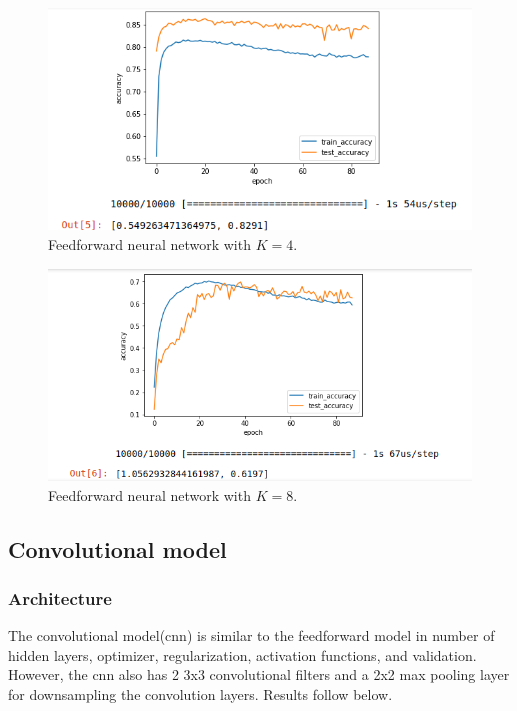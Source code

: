 \documentclass[titlepage]{article}
\begin{document}
\begin{figure}[H]
	\centering
	\includegraphics[width=1.0\textwidth]{4b.png}
	\caption{Feedforward neural network with $K = 4$.}
\end{figure}
\begin{figure}[H]
	\centering
	\includegraphics[width=1.0\textwidth]{8b.png}
	\caption{Feedforward neural network with $K = 8$.}
\end{figure}

\subsection{Convolutional model}
\subsubsection{Architecture}
\par The convolutional model(cnn) is similar to the feedforward model in number of hidden layers, optimizer, regularization, activation functions, and validation. However, the  cnn also has 2 3x3 convolutional  filters and a 2x2 max pooling layer for downsampling the convolution layers. Results follow below.
\end{document}

